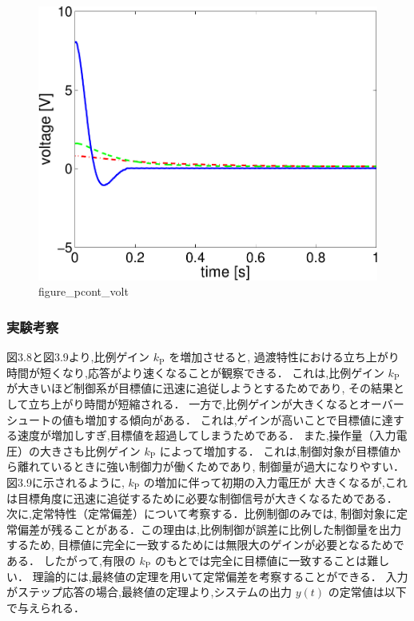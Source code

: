 \begin{figure}[h]
  \centering
  \includegraphics[scale=0.6]{sozai/figure_pcont_volt-crop.pdf}
  \caption{figure\_pcont\_volt}
\end{figure}

\subsubsection{実験考察}
図3.8と図3.9より,比例ゲイン \( k_{\mathrm{P}}\) を増加させると,
過渡特性における立ち上がり時間が短くなり,応答がより速くなることが観察できる．
これは,比例ゲイン \( k_{\mathrm{P}}\) が大きいほど制御系が目標値に迅速に追従しようとするためであり,
その結果として立ち上がり時間が短縮される．
一方で,比例ゲインが大きくなるとオーバーシュートの値も増加する傾向がある．
これは,ゲインが高いことで目標値に達する速度が増加しすぎ,目標値を超過してしまうためである．
また,操作量（入力電圧）の大きさも比例ゲイン \( k_{\mathrm{P}}\) によって増加する．
これは,制御対象が目標値から離れているときに強い制御力が働くためであり,
制御量が過大になりやすい．図3.9に示されるように, \( k_{\mathrm{P}}\) の増加に伴って初期の入力電圧が
大きくなるが,これは目標角度に迅速に追従するために必要な制御信号が大きくなるためである．
次に,定常特性（定常偏差）について考察する．比例制御のみでは,
制御対象に定常偏差が残ることがある．この理由は,比例制御が誤差に比例した制御量を出力するため,
目標値に完全に一致するためには無限大のゲインが必要となるためである．
したがって,有限の \( k_{\mathrm{P}}\)  のもとでは完全に目標値に一致することは難しい．
理論的には,最終値の定理を用いて定常偏差を考察することができる．
入力がステップ応答の場合,最終値の定理より,システムの出力 \( y(t) \) の定常値は以下で与えられる．

